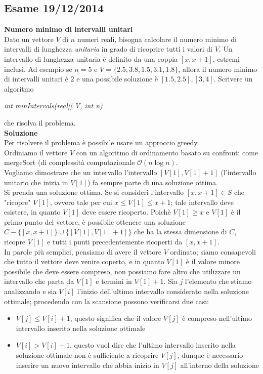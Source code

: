 \documentclass[../cheatSheetAlgoritmi.tex]{subfiles}
\begin{document}
\subsection{Esame 19/12/2014}
\textbf{Numero minimo di intervalli unitari} \\
Dato un vettore $V$ di $n$ numeri reali, bisogna calcolare il numero minimo di intervalli di lunghezza \emph{unitaria} in grado di ricoprire tutti i valori di $V$.  Un intervallo di lunghezza unitaria è definito da una coppia $[x, x + 1]$, estremi inclusi. Ad esempio se $n= 5$ e $V=\{2.5,3.8,1.5,3.1,1.8\}$, allora il numero minimo di intervalli unitari è $2$ e una possibile soluzione è $[1.5,2.5] ,[3,4]$. Scrivere un algoritmo 
\begin{center}
	\emph{int minIntervals(real[] V, int n)}
\end{center}
che risolva il problema. \\
\textbf{Soluzione} \\
Per risolvere il problema è possibile usare un approccio greedy. \\ 
Ordiniamo il vettore $V$ con un algoritmo di ordinamento basato su confronti come mergeSort (di complessità computazionale $\mathcal{O}(n \log n)$. \\
Vogliamo dimostrare che un intervallo l'intervallo $[V[1], V[1] + 1]$ (l'intervallo unitario che inizia in $V[1]$) fa sempre parte di una soluzione ottima.  \\
Si prenda una soluzione ottima. Se si consideri l'intervallo $[x, x + 1] \in S$ che "ricopre" $V[1]$, ovvero tale per cui $x \leq V[1] \leq x + 1$; tale intervallo deve esistere, in quanto $V[1]$ deve essere ricoperto. Poichè $V[1] \geq x$ e $V[1]$ è il primo punto del vettore, è possibile ottenere una soluzione $C - \{[x, x + 1]\} \cup \{[V[1], V[1] + 1]\}$ che ha la stessa dimensione di $C$, ricopre $V[1]$ e tutti i punti precedentemente ricoperti da $[x, x + 1]$. \\
In parole più semplici, pensiamo di avere il vettore $V$ ordinato; siamo consapevoli che tutto il vettore deve venire coperto, e in quanto $V[1]$ è il valore minore possibile che deve essere compreso, non possiamo fare altro che utilizzare un intervallo che parta da $V[1]$ e termini in $V[1] + 1$. Sia $j$ l'elemento che stiamo analizzando e sia $V[i]$ l'inizio dell'ultimo intervallo considerato nella soluzione ottimale; procedendo con la scansione possono verificarsi due casi:
\begin{itemize}
	\item $V[j] \leq V[i] + 1$, questo significa che il valore $V[j]$ è compreso nell'ultimo intervallo inserito nella soluzione ottimale
	\item $V[i] > V[i] + 1$, questo vuol dire che l'ultimo intervallo inserito nella soluzione ottimale non è sufficiente a ricoprire $V[j]$, dunque è necessario inserire un nuovo intervallo che abbia inizio in $V[j]$ all'interno della soluzione
\end{itemize}
\end{document}
